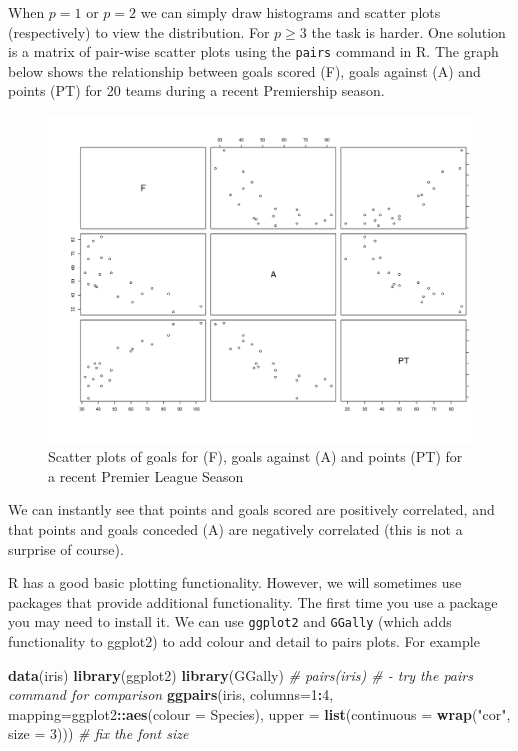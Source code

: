 \documentclass[]{book}
\newenvironment{Shaded}{\begin{snugshade}}{\end{snugshade}}
\newcommand{\CommentTok}[1]{\textcolor[rgb]{0.56,0.35,0.01}{\textit{#1}}}
\newcommand{\DataTypeTok}[1]{\textcolor[rgb]{0.13,0.29,0.53}{#1}}
\newcommand{\DecValTok}[1]{\textcolor[rgb]{0.00,0.00,0.81}{#1}}
\newcommand{\KeywordTok}[1]{\textcolor[rgb]{0.13,0.29,0.53}{\textbf{#1}}}
\newcommand{\NormalTok}[1]{#1}
\newcommand{\OperatorTok}[1]{\textcolor[rgb]{0.81,0.36,0.00}{\textbf{#1}}}
\newcommand{\StringTok}[1]{\textcolor[rgb]{0.31,0.60,0.02}{#1}}
\theoremstyle{definition}
\theoremstyle{definition}
\theoremstyle{definition}
\theoremstyle{remark}
\begin{document}
When \(p=1\) or \(p=2\) we can simply draw histograms and scatter plots (respectively) to view the distribution. For \(p \geq 3\) the task is harder. One solution is a matrix of pair-wise scatter plots using the \texttt{pairs} command in R. The graph below shows the relationship between goals scored (F), goals against (A) and points (PT) for 20 teams during a recent Premiership season.

\begin{figure}
\centering
\includegraphics{figs/pairs.png}
\caption{\label{fig:unnamed-chunk-6}Scatter plots of goals for (F), goals against (A) and points (PT) for a recent Premier League Season}
\end{figure}

We can instantly see that points and goals scored are positively correlated, and that points and goals conceded (A) are negatively correlated (this is not a surprise of course).

R has a good basic plotting functionality. However, we will sometimes use packages that provide additional functionality. The first time you use a package you may need to install it. We can use \texttt{ggplot2} and \texttt{GGally} (which adds functionality to ggplot2) to add colour and detail to pairs plots. For example

\begin{Shaded}
\begin{Highlighting}[]
\KeywordTok{data}\NormalTok{(iris)}
\KeywordTok{library}\NormalTok{(ggplot2)}
\KeywordTok{library}\NormalTok{(GGally)}
\CommentTok{# pairs(iris) # - try the pairs command for comparison}
\KeywordTok{ggpairs}\NormalTok{(iris, }\DataTypeTok{columns=}\DecValTok{1}\OperatorTok{:}\DecValTok{4}\NormalTok{,  }\DataTypeTok{mapping=}\NormalTok{ggplot2}\OperatorTok{::}\KeywordTok{aes}\NormalTok{(}\DataTypeTok{colour =}\NormalTok{ Species),}
        \DataTypeTok{upper =} \KeywordTok{list}\NormalTok{(}\DataTypeTok{continuous =} \KeywordTok{wrap}\NormalTok{(}\StringTok{"cor"}\NormalTok{, }\DataTypeTok{size =} \DecValTok{3}\NormalTok{)))  }\CommentTok{# fix the font size}
\end{Highlighting}
\end{Shaded}
\end{document}
